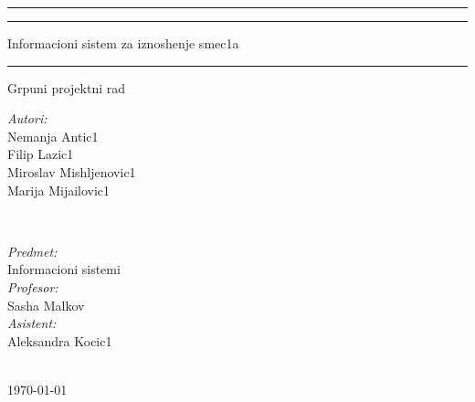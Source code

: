 \documentclass[10 pt]{article}
\begin{document}
	
	\begin{titlepage} 
		\centering 
		
		\rule{\textwidth}{1pt}
		
		\vspace{2pt}\vspace{-\baselineskip} 
		
		\rule{\textwidth}{0.5pt}
		
		\vspace{0.025\textheight}
		
		{\Huge Informacioni sistem za iznoshenje smec1a}\\
		
		\vspace{0.020\textheight}
		
		\rule{0.5\textwidth}{1pt}
		
		\vspace{0.020\textheight}
		
		{\LARGE Grpuni projektni rad}
		
		\vspace{0.5\textheight}
		
		\begin{minipage}{0.4\textwidth}
			\begin{flushleft} \large
				\emph{Autori:}\\
				Nemanja Antic1\\
				Filip Lazic1\\
				Miroslav Mishljenovic1\\
				Marija Mijailovic1
			\end{flushleft}
		\end{minipage}
		~
		\begin{minipage}{0.5\textwidth}
			\begin{flushright} \large
				\emph{Predmet:}\\ 
				Informacioni sistemi\\
				\emph{Profesor:}\\ 
				Sasha Malkov\\
				\emph{Asistent:}\\ 
				Aleksandra Kocic1
			\end{flushright}
		\end{minipage}\\[2cm]
		
		{\large \today}\\[2cm]
		
		
	\end{titlepage}
	
	
	\thispagestyle{empty}
	
\end{document}
